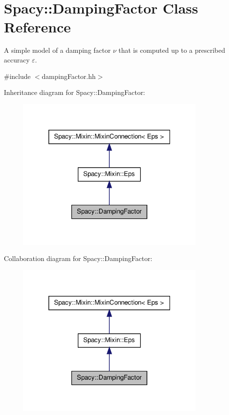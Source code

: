 \hypertarget{classSpacy_1_1DampingFactor}{\section{\-Spacy\-:\-:\-Damping\-Factor \-Class \-Reference}
\label{classSpacy_1_1DampingFactor}
}


\-A simple model of a damping factor $\nu$ that is computed up to a prescribed accuracy $\varepsilon$.  




{\ttfamily \#include $<$damping\-Factor.\-hh$>$}



\-Inheritance diagram for \-Spacy\-:\-:\-Damping\-Factor\-:
\nopagebreak
\begin{figure}[H]
\begin{center}
\leavevmode
\includegraphics[width=268pt]{classSpacy_1_1DampingFactor__inherit__graph}
\end{center}
\end{figure}


\-Collaboration diagram for \-Spacy\-:\-:\-Damping\-Factor\-:
\nopagebreak
\begin{figure}[H]
\begin{center}
\leavevmode
\includegraphics[width=268pt]{classSpacy_1_1DampingFactor__coll__graph}
\end{center}
\end{figure}
